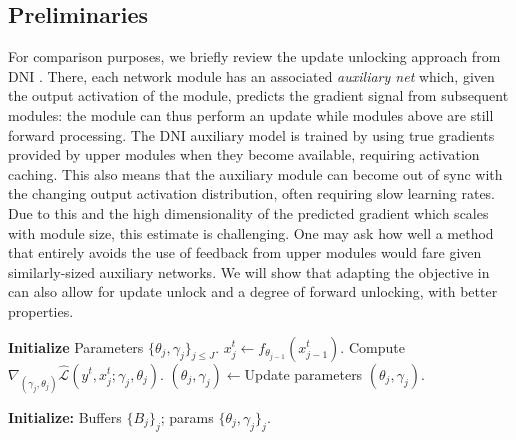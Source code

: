 \documentclass{article}
\begin{document}
\subsection{Preliminaries}
For comparison purposes, we briefly review the update unlocking approach from  DNI \citep{jaderberg2016decoupled}. There, each network module has an associated \textit{auxiliary net} which, given the output activation of the module, predicts the gradient signal from subsequent modules: the module can thus perform an update while modules above are still forward processing. The DNI auxiliary model is trained by using true gradients provided by upper modules when they become available, requiring activation caching. This also means that the auxiliary module can become out of sync with the changing output activation distribution, often requiring slow learning rates. Due to this and the high dimensionality of the predicted gradient which scales with module size, this estimate is challenging. One may ask how well a method that entirely avoids the use of feedback from upper modules would fare given similarly-sized auxiliary networks. We will show that adapting the objective in \citep{shallow,bengio2007greedy} can also allow for update unlock and a degree of forward unlocking, with better properties.
\vspace{-10pt}
\setlength{\textfloatsep}{1pt}
    \begin{algorithm2e}\small
    \caption{Synchronous DGL}\label{algo:basic}
  \SetAlgoLined
  \DontPrintSemicolon
{}
\textbf{Initialize} Parameters $\{\theta_j,\gamma_j\}_{j\leq J}$.\;
{
   {$x^t_j \leftarrow f_{\theta_{j-1}}(x^t_{j-1})$.\;
Compute $\nabla_{(\gamma_j,\theta_j)}\hat{ \mathcal{L}}(y^t,x^t_j;\gamma_j,\theta_j)$.\;
$(\theta_j,\gamma_j)\leftarrow$Update parameters $(\theta_j,\gamma_j)$.
   }
 }
\end{algorithm2e}\vspace{-20pt}\begin{algorithm2e}\small
 \SetAlgoLined
  \DontPrintSemicolon
 \textbf{Initialize:} Buffers $\{B_j\}_{j}$; params $\{\theta_j,\gamma_j\}_{j}$.\\
    \caption{Asynchronous DGL with Replay\label{algo:buffer_sym}}\end{algorithm2e}
    
\end{document}
